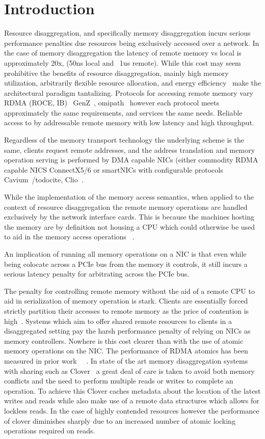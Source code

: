 \section{Introduction}

Resource disaggregation, and specifically memory disaggregation incurs serious
performance penalties due resources being exclusively accessed over a network.
In the case of memory disaggregation the latency of remote memory vs local is
approximately 20x, (50ns local and ~1us remote). While this cost may seem
prohibitive the benefits of resource disaggregation, mainly high memory
utilization, arbitrarily flexible resource allocation, and energy efficiency~\cite{zombieland}
make the architectural paradigm tantalizing.
Protocols for accessing remote memory vary RDMA (ROCE, IB)~\cite{infiniband-spec}
GenZ~\cite{genz}, omipath~
however each protocol meets approximately the same
requirements, and services the same needs. Reliable access to by addressable
remote memory with low latency and high throughput.

Regardless of the memory transport technology the underlying scheme is the same,
clients request remote addresses, and the address translation and memory
operation serving is performed by DMA capable NICs (either commodity RDMA
capable NICS ConnectX5/6 or smartNICs with configurable protocols 
Cavium~/todo{cite}, Clio~. 

While the implementation of the memory access semantics, when
applied to the context of resource disaggregation the remote memory operations
are handled exclusively by the network interface cards. This is because the
machines hosting the memory are by definition not housing a CPU which could
otherwise be used to aid in the memory access operations
~\cite{herd,sonuma,storm,erpc,cliquemap}. 

An implication of running all memory
operations on a NIC is that even while being colocate across a PCIe bus from
the memory it controls, it still incurs a serious latency penalty for
arbitrating across the PCIe bus.

The penalty for controlling remote memory without the aid of a remote CPU to aid
in serialization of memory operation is stark. Clients are essentially forced
strictly partition their accesses to remote memory as the price of contention is
high~\cite{legoos, reigons}. Systems which aim to offer shared remote
resources to clients in a disaggregated setting pay the harsh performance
penalty of relying on NICs as memory controllers. Nowhere is this cost clearer
than with the use of atomic memory operations on the NIC. The performance of
RDMA atomics has been measured in prior work ~\cite{design-guidelines}~\cite{clover}. In state of the art memory disaggregation systems with
sharing such as Clover~\cite{clover} a great deal of care is taken to avoid both
memory conflicts and the need to perform multiple reads or writes to complete an
operation. To achieve this Clover caches metadata about the location of the
latest writes and reads while also make use of a remote data structures which
allows for lockless reads. In the case of highly contended resources however the
performance of clover diminishes sharply due to an increased number of atomic
locking operations required on reads.

